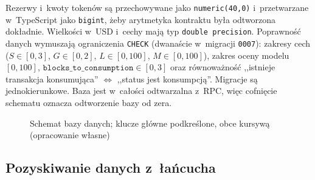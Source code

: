 Rezerwy i~kwoty tokenów są przechowywane jako \texttt{numeric(40,0)} i~przetwarzane
w~TypeScript jako \texttt{bigint}, żeby arytmetyka kontraktu była odtworzona dokładnie.
Wielkości w~USD i~cechy mają typ \texttt{double precision}. Poprawność danych wymuszają
ograniczenia \texttt{CHECK} (dwanaście w~migracji \texttt{0007}): zakresy cech ($S\in[0,3]$,
$G\in[0,2]$, $L\in[0,100]$, $M\in[0,100]$), zakres oceny modelu $[0,100]$,
$\texttt{blocks\_to\_consumption}\in[0,3]$ oraz równoważność ,,istnieje transakcja konsumująca''
$\Leftrightarrow$ ,,status jest konsumpcją''. Migracje są jednokierunkowe. Baza jest w~całości
odtwarzalna z~RPC, więc cofnięcie schematu oznacza odtworzenie bazy od zera.
\begin{figure}[H]\centering\resizebox{\linewidth}{!}{}
\caption{Schemat bazy danych; klucze główne podkreślone, obce kursywą (opracowanie własne)}\label{fig:erd}\end{figure}

\subsection{Pozyskiwanie danych z~łańcucha}


